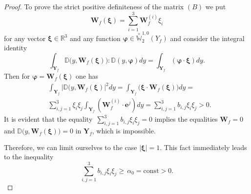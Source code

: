 \documentclass[10pt,a4paper]{amsart}
\begin{document}
\begin{proof}
To prove the strict positive definiteness of the matrix $(B)$ we put
\begin{equation*}
\boldsymbol{W}_{f}(\boldsymbol{\xi})=\sum_{i=1}^{3}\boldsymbol{W}_{f}^{(i)}\xi_{i}
\end{equation*}
for any vector $\boldsymbol{\xi}\in\mathbb{R}^{3}$ and any function
$\boldsymbol{\varphi}\in\stackrel{\!\!\circ}{\mathbb{W}}^{1,0}_{2}({Y}_{f})$ and consider
the integral identity
\begin{equation}\label{eq5.18}
\int_{\textbf{Y}_{f}}\mathbb{D}\big(y,\boldsymbol{W}_{f}(\boldsymbol{\xi})\big):
\mathbb{D}(y,\boldsymbol{\varphi})dy=
\int_{\textbf{Y}_{f}}(\boldsymbol{\varphi}\cdot\boldsymbol{\xi})dy.
\end{equation}
Then for $\boldsymbol{\varphi}=\boldsymbol{W}_{f}(\boldsymbol{\xi})$ one has
\begin{equation}\label{eq5.19}
\begin{aligned}
& 
\int_{\textbf{Y}_{f}}|\mathbb{D}(y,\boldsymbol{W}_{f}(\boldsymbol{\xi})|^{2}dy=
\int_{\textbf{Y}_{f}}\big(\boldsymbol{\xi}\cdot\boldsymbol{W}_{f}(\boldsymbol{\xi})\big)dy=
\\
& \sum_{i,j=1}^{3}{\xi}_{i}{\xi}_{j}\int_{\textbf{Y}_{f}}(\boldsymbol{W}_{f}^{(i)}
\cdot\boldsymbol{e}^{j})dy=\sum_{i,j=1}^{3}{b}_{i,j}{\xi}_{i}{\xi}_{j}>0.
\end{aligned}
\end{equation}
It is evident that the equality $\displaystyle\,\sum_{i,j=1}^{3}{b}_{i,j}{\xi}_{i}{\xi}_{j}=0$
implies the equalities $\boldsymbol{W}_{f}=0$ and $\mathbb{D}\big(y,\boldsymbol{W}_{f}(\boldsymbol{\xi})\big)=0$ in $\textbf{Y}_{f}$, which is impossible.

Therefore, we can limit ourselves to the case $|\boldsymbol{\xi}|=1$. This fact immediately leads to the inequality
\begin{equation*}
\sum_{i,j=1}^{3}{b}_{i,j}{\xi}_{i}{\xi}_{j}\geqslant\,\alpha_{0}=\mbox{const}>0.
\end{equation*}
\end{proof}
\end{document}

